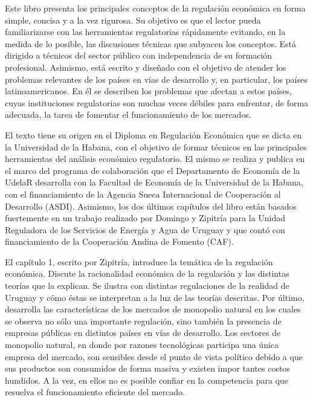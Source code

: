 \documentclass[
  12pt,
  spanish,
]{book}
\begin{document}
Este libro presenta los principales conceptos de la regulación económica en forma simple, concisa y a la vez rigurosa. Su objetivo es que el lector pueda familiarizarse con las herramientas regulatorias rápidamente evitando, en la medida de lo posible, las discusiones técnicas que subyacen los conceptos. Está dirigido a técnicos del sector público con independencia de su formación profesional. Asimismo, está escrito y diseñado con el objetivo de atender los problemas relevantes de los países en vías de desarrollo y, en particular, los países latinoamericanos. En él se describen los problemas que afectan a estos países, cuyas instituciones regulatorias son muchas veces débiles para enfrentar, de forma adecuada, la tarea de fomentar el funcionamiento de los mercados.

El texto tiene su origen en el Diploma en Regulación Económica que se dicta en la Universidad de la Habana, con el objetivo de formar técnicos en las principales herramientas del análisis económico regulatorio. El mismo se realiza y publica en el marco del programa de colaboración que el Departamento de Economía de la UdelaR desarrolla con la Facultad de Economía de la Universidad de la Habana, con el financiamiento de la Agencia Sueca Internacional de Cooperación al Desarrollo (ASDI). Asimismo, los dos últimos capítulos del libro están basados fuertemente en un trabajo realizado por Domingo y Zipitría para la Unidad Reguladora de los Servicios de Energía y Agua de Uruguay y que contó con financiamiento de la Cooperación Andina de Fomento (CAF).

El capítulo 1, escrito por Zipitría, introduce la temática de la regulación económica. Discute la racionalidad económica de la regulación y las distintas teorías que la explican. Se ilustra con distintas regulaciones de la realidad de Uruguay y cómo éstas se interpretan a la luz de las teorías descritas. Por último, desarrolla las características de los mercados de monopolio natural en los cuales se observa no sólo una importante regulación, sino también la presencia de empresas públicas en distintos países en vías de desarrollo. Los sectores de monopolio natural, en donde por razones tecnológicas participa una única empresa del mercado, son sensibles desde el punto de vista político debido a que sus productos son consumidos de forma masiva y existen impor tantes costos hundidos. A la vez, en ellos no es posible confiar en la competencia para que resuelva el funcionamiento eficiente del mercado.
\end{document}
